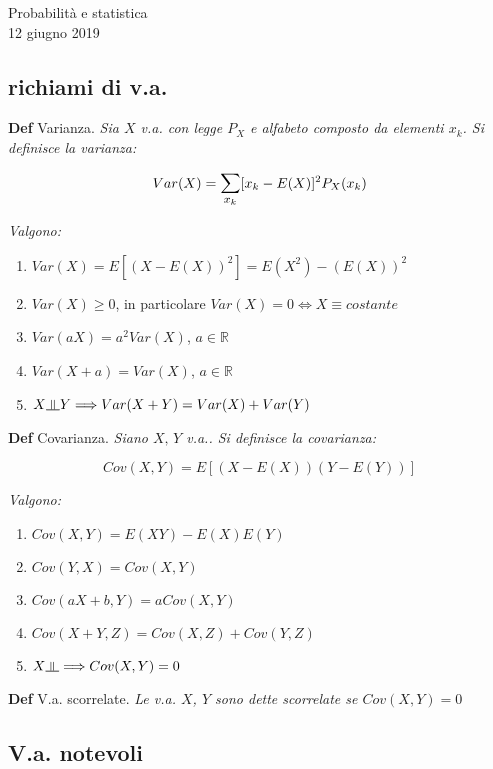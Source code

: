 \documentclass[a4paper,9pt]{article}
\newcommand{\indep}{\rotatebox[origin=c]{90}{$\models$}}
\begin{document}
\begin{multicols*}{3}

\begin{center}
    \Large{Probabilit\`a e statistica} \\
    \footnotesize{12 giugno 2019}
\end{center}

\bigskip

\subsection*{richiami di v.a.}
\textbf{Def} Varianza. \textit{Sia $X$ v.a. con legge $P_X$ e alfabeto composto da elementi $x_k$. Si definisce la varianza:}

$$Var(X) = \mathlarger{\sum_{x_k}}[x_k - E(X)]^2 P_X(x_k)$$

\textit{Valgono:}
\begin{enumerate}
\item $Var(X) = E[(X-E(X))^2] = E(X^2) - (E(X))^2$
\item $Var(X) \geq 0$, in particolare $Var(X) = 0 \Leftrightarrow X \equiv costante$
\item $Var(aX) = a^2 Var(X)$, $a \in \mathbb{R}$
\item $Var(X + a) = Var(X)$, $a \in \mathbb{R}$
\item $X \indep Y \Longrightarrow Var(X+Y) = Var(X) + Var(Y)$
\end{enumerate}


\textbf{Def} Covarianza. \textit{Siano $X,\,Y$ v.a.. Si definisce la covarianza:}

$$Cov(X, Y) = E[(X - E(X))(Y - E(Y))]$$

\textit{Valgono:}
\begin{enumerate}
\item $Cov(X, Y) = E(XY) - E(X)E(Y)$
\item $Cov(Y, X) = Cov(X, Y)$
\item $Cov(aX + b, Y) = aCov(X, Y)$
\item $Cov(X + Y, Z) = Cov(X, Z) + Cov(Y, Z)$
\item $X \indep \Longrightarrow Cov(X, Y) = 0$
\end{enumerate}


\textbf{Def} V.a. scorrelate. \textit{Le v.a. $X$, $Y$ sono dette scorrelate se $Cov(X, Y) = 0$}

\subsection*{V.a. notevoli}


\end{multicols*}
\end{document}
